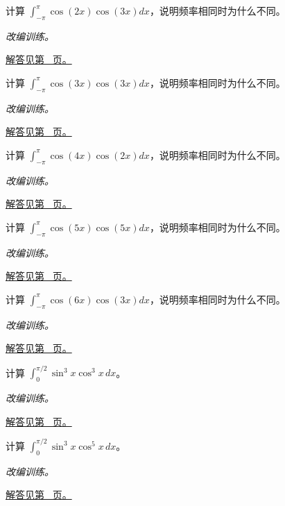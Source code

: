 \documentclass[UTF8,12pt,a4paper,fontset=fandol]{ctexart}
\begin{document}
\begin{example}[余弦函数的正交积分]\label{ex:c16q14}
计算 $\int_{-\pi}^\pi\cos(2x)\cos(3x)dx$，说明频率相同时为什么不同。
\par\textit{改编训练。}\par\hyperref[ans:c16q14]{解答见第~\pageref{ans:c16q14} 页。}
\end{example}
\begin{example}[余弦函数的正交积分]\label{ex:c16q15}
计算 $\int_{-\pi}^\pi\cos(3x)\cos(3x)dx$，说明频率相同时为什么不同。
\par\textit{改编训练。}\par\hyperref[ans:c16q15]{解答见第~\pageref{ans:c16q15} 页。}
\end{example}
\begin{example}[余弦函数的正交积分]\label{ex:c16q16}
计算 $\int_{-\pi}^\pi\cos(4x)\cos(2x)dx$，说明频率相同时为什么不同。
\par\textit{改编训练。}\par\hyperref[ans:c16q16]{解答见第~\pageref{ans:c16q16} 页。}
\end{example}
\begin{example}[余弦函数的正交积分]\label{ex:c16q17}
计算 $\int_{-\pi}^\pi\cos(5x)\cos(5x)dx$，说明频率相同时为什么不同。
\par\textit{改编训练。}\par\hyperref[ans:c16q17]{解答见第~\pageref{ans:c16q17} 页。}
\end{example}
\begin{example}[余弦函数的正交积分]\label{ex:c16q18}
计算 $\int_{-\pi}^\pi\cos(6x)\cos(3x)dx$，说明频率相同时为什么不同。
\par\textit{改编训练。}\par\hyperref[ans:c16q18]{解答见第~\pageref{ans:c16q18} 页。}
\end{example}
\begin{example}[两种奇次幂的混合积分]\label{ex:c16q19}
计算 $\int_0^{\pi/2}\sin^{3}x\cos^{3}x\,dx$。
\par\textit{改编训练。}\par\hyperref[ans:c16q19]{解答见第~\pageref{ans:c16q19} 页。}
\end{example}
\begin{example}[两种奇次幂的混合积分]\label{ex:c16q20}
计算 $\int_0^{\pi/2}\sin^{3}x\cos^{5}x\,dx$。
\par\textit{改编训练。}\par\hyperref[ans:c16q20]{解答见第~\pageref{ans:c16q20} 页。}
\end{example}
\end{document}
